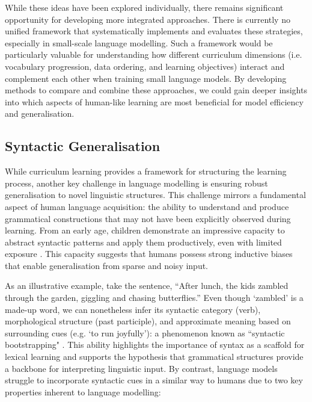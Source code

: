 \vspace{1em}

While these ideas have been explored individually, there remains significant opportunity for developing more integrated approaches. There is currently no unified framework that systematically implements and evaluates these strategies, especially in small-scale language modelling. Such a framework would be particularly valuable for understanding how different curriculum dimensions (i.e. vocabulary progression, data ordering, and learning objectives) interact and complement each other when training small language models. By developing methods to compare and combine these approaches, we could gain deeper insights into which aspects of human-like learning are most beneficial for model efficiency and generalisation.

\subsection{Syntactic Generalisation}

While curriculum learning provides a framework for structuring the learning process, another key challenge in language modelling is ensuring robust generalisation to novel linguistic structures. This challenge mirrors a fundamental aspect of human language acquisition: the ability to understand and produce grammatical constructions that may not have been explicitly observed during learning. From an early age, children demonstrate an impressive capacity to abstract syntactic patterns and apply them productively, even with limited exposure \citep{yang2013poverty, legate2002empirical}. This capacity suggests that humans possess strong inductive biases that enable generalisation from sparse and noisy input.

As an illustrative example, take the sentence, ``After lunch, the kids zambled through the garden, giggling and chasing butterflies.'' Even though `zambled' is a made-up word, we can nonetheless infer its syntactic category (verb), morphological structure (past participle), and approximate meaning based on surrounding cues (e.g. `to run joyfully'): a phenomenon known as ``syntactic bootstrapping" \citep{gleitman1990structural, naigles1990children}. This ability highlights the importance of syntax as a scaffold for lexical learning and supports the hypothesis that grammatical structures provide a backbone for interpreting linguistic input. By contrast, language models struggle to incorporate syntactic cues in a similar way to humans due to two key properties inherent to language modelling:

